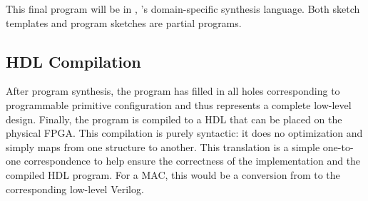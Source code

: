 This final program will be in \lrir,
  \lr's domain-specific synthesis language.
Both sketch templates and program sketches
  are partial \lrir programs.
  
\subsection{HDL Compilation} 

After program synthesis,
  the \lrir program has filled in all holes
  corresponding to programmable primitive configuration and thus represents a complete low-level design.
Finally, the \lrir program
  is compiled to a HDL that can
  be placed on the physical FPGA.
This compilation is purely syntactic:
  it does no optimization and simply
  maps from one structure to another.
This translation is a simple
  one-to-one correspondence to
  help ensure the correctness
  of the \lrir implementation
  and the compiled HDL program.
For a MAC, this would be a conversion from \lrir to
  the corresponding low-level Verilog.

%
%
%
%
%
%
%
%
%
%
